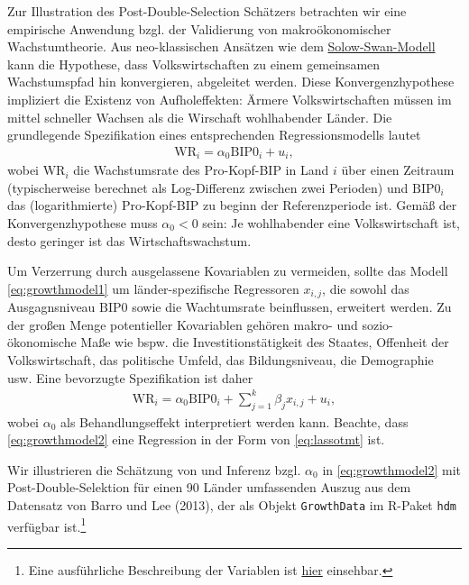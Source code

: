 \documentclass[
  a4paper,
  DIV=11,
  oneside]{scrreprt}
\begin{document}
Zur Illustration des Post-Double-Selection Schätzers betrachten wir eine
empirische Anwendung bzgl. der Validierung von makroökonomischer
Wachstumtheorie. Aus neo-klassischen Ansätzen wie dem
\href{https://de.wikipedia.org/wiki/Solow-Modell}{Solow-Swan-Modell}
kann die Hypothese, dass Volkswirtschaften zu einem gemeinsamen
Wachstumspfad hin konvergieren, abgeleitet werden. Diese
Konvergenzhypothese impliziert die Existenz von Aufholeffekten: Ärmere
Volkswirtschaften müssen im mittel schneller Wachsen als die Wirschaft
wohlhabender Länder. Die grundlegende Spezifikation eines entsprechenden
Regressionsmodells lautet \begin{align}
  \text{WR}_{i} = \alpha_0 \text{BIP0}_i + u_i, \label{eq:growthmodel1}
\end{align} wobei \(\text{WR}_{i}\) die Wachstumsrate des Pro-Kopf-BIP
in Land \(i\) über einen Zeitraum (typischerweise berechnet als
Log-Differenz zwischen zwei Perioden) und \(\text{BIP0}_i\) das
(logarithmierte) Pro-Kopf-BIP zu beginn der Referenzperiode ist. Gemäß
der Konvergenzhypothese muss \(\alpha_0<0\) sein: Je wohlhabender eine
Volkswirtschaft ist, desto geringer ist das Wirtschaftswachstum.

Um Verzerrung durch ausgelassene Kovariablen zu vermeiden, sollte das
Modell \eqref{eq:growthmodel1} um länder-spezifische Regressoren
\(x_{i,j}\), die sowohl das Ausgagnsniveau \(\text{BIP0}\) sowie die
Wachtumsrate beinflussen, erweitert werden. Zu der großen Menge
potentieller Kovariablen gehören makro- und sozio-ökonomische Maße wie
bspw. die Investitionstätigkeit des Staates, Offenheit der
Volkswirtschaft, das politische Umfeld, das Bildungsniveau, die
Demographie usw. Eine bevorzugte Spezifikation ist daher \begin{align}
  \text{WR}_{i} = \alpha_0 \text{BIP0}_i + \sum_{j=1}^k \beta_j x_{i,j} + u_i,\label{eq:growthmodel2}
\end{align} wobei \(\alpha_0\) als Behandlungseffekt interpretiert
werden kann. Beachte, dass \eqref{eq:growthmodel2} eine Regression in
der Form von \eqref{eq:lassotmt} ist.

Wir illustrieren die Schätzung von und Inferenz bzgl. \(\alpha_0\) in
\eqref{eq:growthmodel2} mit Post-Double-Selektion für einen 90 Länder
umfassenden Auszug aus dem Datensatz von Barro und Lee (2013), der als
Objekt \texttt{GrowthData} im R-Paket \texttt{hdm} verfügbar
ist.\footnote{Eine ausführliche Beschreibung der Variablen ist
  \href{https://www2.nber.org/pub/barro.lee/readme.txt}{hier} einsehbar.}
\end{document}
